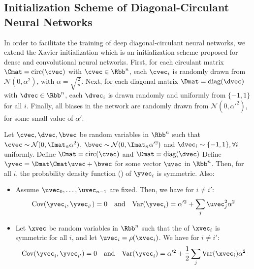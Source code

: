 \subsection{Initialization Scheme of Diagonal-Circulant Neural Networks}
\label{subsection:ch4-initialization_scheme_of_diagonal-circulant_neural_networks}

In order to facilitate the training of deep diagonal-circulant neural networks, we extend the Xavier initialization \cite{glorot2010understanding} which is an initialization scheme proposed for dense and convolutional neural networks.
First, for each circulant matrix $\Cmat = \circulant (\cvec)$ with $\cvec \in \Rbb^n$, each $\cvec_i$ is randomly drawn from $\mathcal{N} \left(0,\alpha^2\right)$, with $\alpha = \sqrt{\frac{2}{n}}$.
Next, for each diagonal matrix $\Dmat = \diagonal (\dvec)$ with $\dvec \in \Rbb^n$, each $\dvec_{i}$ is drawn randomly and uniformly from $\{-1,1\}$ for all $i$.
Finally, all biases in the network are randomly drawn from $\mathcal{N}\left(0,\alpha'^{2}\right)$, for some small value of $\alpha'$.


\begin{lemma} \label{lemma:ch4-covariance}
  Let $\cvec, \dvec, \bvec$ be random variables in $\Rbb^n$ such that $\cvec \sim \mathcal{N}(0, \Imat_n\alpha^2)$, $\bvec \sim \mathcal{N}(0, \Imat_n\alpha'^2)$ and $\dvec_i \sim \{-1, 1\}, \forall i$ uniformly.
  Define $\Cmat = \circulant(\cvec)$ and $\Dmat = \diagonal(\dvec)$
  Define $\yvec = \Dmat \Cmat \uvec + \bvec$ for some vector $\uvec$ in $\Rbb^n$.
  Then, for all $i$, the probability density function (\pdf) of $\yvec_{i}$ is symmetric.
  Also:
  \begin{itemize}
    \item Assume $\uvec_0, \ldots, \uvec_{n-1}$ are fixed. Then, we have for $i \neq i'$:
      \begin{equation}
	\Cov(\yvec_i, \yvec_{i'}) = 0 \quad \text{and} \quad
	\Var(\yvec_i) = \alpha'^2 + \sum_{j} \uvec_{j}^{2} \alpha^{2}
      \end{equation}
    \item Let $\xvec$ be random variables in $\Rbb^n$ such that the \pdf of $\xvec_i$ is symmetric for all $i$, and let $\uvec_i = \rho(\xvec_i)$.
      We have for $i \neq i':$
      \begin{equation}
	\Cov(\yvec_i, \yvec_{i'}) = 0 \quad \text{and} \quad
	\Var(\yvec_i) = \alpha'^2 + \frac{1}{2} \sum_{j} \Var(\xvec_i) \alpha^2
      \end{equation}
  \end{itemize}
\end{lemma}

